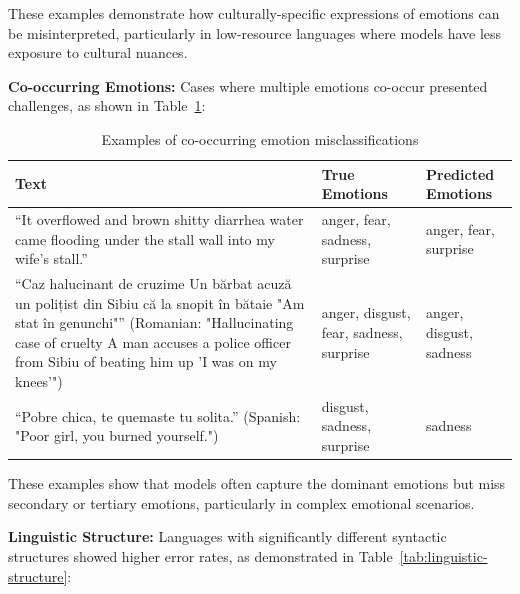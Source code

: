 \documentclass[a4paper,12pt]{extarticle}
\begin{document}
These examples demonstrate how culturally-specific expressions of emotions can be misinterpreted, particularly in low-resource languages where models have less exposure to cultural nuances.

\textbf{Co-occurring Emotions:} Cases where multiple emotions co-occur presented challenges, as shown in Table~\ref{tab:co-occurring-emotions}:

\begin{table}[h]
\centering
\begin{tabular}{|p{8.5cm}|p{2.5cm}|p{2.5cm}|}
\hline
\textbf{Text} & \textbf{True Emotions} & \textbf{Predicted Emotions} \\
\hline
``It overflowed and brown shitty diarrhea water came flooding under the stall wall into my wife's stall.'' & anger, fear, sadness, surprise & anger, fear, surprise \\
\hline
``Caz halucinant de cruzime Un bărbat acuză un polițist din Sibiu că la snopit în bătaie "Am stat în genunchi"'' \newline (Romanian: "Hallucinating case of cruelty A man accuses a police officer from Sibiu of beating him up 'I was on my knees'") & anger, disgust, fear, sadness, surprise & anger, disgust, sadness \\
\hline
``Pobre chica, te quemaste tu solita.'' \newline (Spanish: "Poor girl, you burned yourself.") & disgust, sadness, surprise & sadness \\
\hline
\end{tabular}
\caption{Examples of co-occurring emotion misclassifications}
\label{tab:co-occurring-emotions}
\end{table}

These examples show that models often capture the dominant emotions but miss secondary or tertiary emotions, particularly in complex emotional scenarios.

\textbf{Linguistic Structure:} Languages with significantly different syntactic structures showed higher error rates, as demonstrated in Table~\ref{tab:linguistic-structure}:
\end{document}
